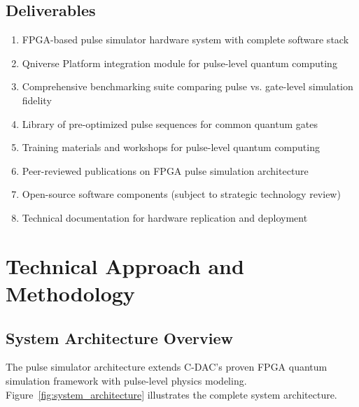\documentclass[12pt,a4paper]{article}
\begin{document}
\subsection{Deliverables}

\begin{enumerate}[noitemsep]
\item FPGA-based pulse simulator hardware system with complete software stack
\item Qniverse Platform integration module for pulse-level quantum computing
\item Comprehensive benchmarking suite comparing pulse vs. gate-level simulation fidelity
\item Library of pre-optimized pulse sequences for common quantum gates
\item Training materials and workshops for pulse-level quantum computing
\item Peer-reviewed publications on FPGA pulse simulation architecture
\item Open-source software components (subject to strategic technology review)
\item Technical documentation for hardware replication and deployment
\end{enumerate}

\newpage

\section{Technical Approach and Methodology}

\subsection{System Architecture Overview}

The pulse simulator architecture extends C-DAC's proven FPGA quantum simulation framework with pulse-level physics modeling. Figure~\ref{fig:system_architecture} illustrates the complete system architecture.
\end{document}
